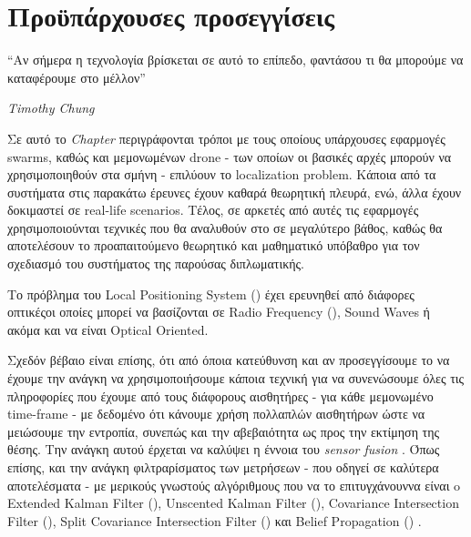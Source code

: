\chapter{Προϋπάρχουσες προσεγγίσεις} \label{chap:Chapter2}       
\epigraph{``Αν σήμερα η τεχνολογία βρίσκεται σε αυτό το επίπεδο, φαντάσου τι θα μπορούμε να καταφέρουμε στο μέλλον” }{\textit{Timothy Chung}}

Σε αυτό το \emph{Chapter} περιγράφονται τρόποι με τους οποί\-ους υπάρχουσες εφαρμογές  swarms, καθώς και 
μεμονωμένων drone - των οποίων οι βασικές αρχές μπορούν να χρησιμοποιηθούν στα σμήνη - επιλύουν το localization pro\-blem. Κάποια από τα συστήματα στις 
παρακάτω έρευνες έχουν καθαρά θεωρητική πλευρά, ενώ, άλλα έχουν δοκιμαστεί σε real-life scenarios.
Τέλος, σε α\-ρκε\-τές από αυτές τις εφαρμογές χρησιμοποιούνται τεχνικές που θα αναλυθούν στο 
σε μεγαλύτερο βάθος, καθώς θα αποτελέσουν το προαπαιτούμενο θεωρητικό και μαθηματικό υπόβαθρο για τον σχεδιασμό 
του συστήματος της παρούσας διπλωματικής.

Το πρόβλημα του Local Positioning System () \cite{lps} έχει ερευνηθεί από διάφορες οπτικές\udot οι 
οποίες μπορεί να βασίζονται σε Radio Frequency (), Sound Waves ή ακόμα και να είναι Optical Oriented.

Σχεδόν βέβαιο είναι επίσης, ότι από όποια κατεύθυνση και αν προσεγγίσουμε το  να έχουμε την ανάγκη να 
χρησιμοποιήσουμε κάποια τεχνική για να συνενώσουμε όλες τις πληροφορίες που έχουμε από τους διάφορους αισθητήρες -
για κάθε μεμονωμένο time-frame - με δεδομένο ότι κάνουμε χρήση πολλαπλών αισθητήρων ώστε να μειώσουμε την εντροπία, 
συνεπώς και την αβεβαιότητα ως προς την εκτίμηση της θέσης. 
Την ανάγκη αυτού έρχεται να καλύψει η έννοια του \emph{sensor fusion} \cite{sensor-fusion}. Όπως επίσης, και την 
ανάγκη φιλτραρίσματος των μετρήσεων - που οδηγεί σε καλύτερα αποτε\-λέ\-σμα\-τα - με μερικούς γνωστούς αλγόριθμους 
που να το επιτυγχάνουν\udot να είναι o Extended Kalman Filter (), Unscented Kalman Filter (), 
Covariance Intersection Filter (),  Split  Covariance  Intersection  Filter () και  Belief  
Propagation () \cite{fusion-filters}. 

